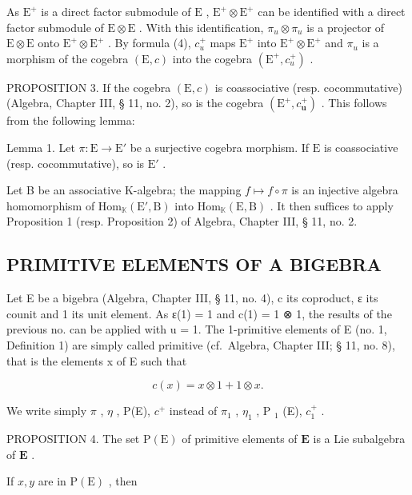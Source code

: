 As \(\mathrm{E}^{+}\) is a direct factor submodule of \(\mathrm{E}\) , \(\mathrm{E}^{+} \otimes \mathrm{E}^{+}\) can be identified with a direct factor submodule of \(\mathrm{E} \otimes \mathrm{E}\) . With this identification, \(\pi_{u} \otimes \pi_{u}\) is a projector of \(\mathrm{E} \otimes \mathrm{E}\) onto \(\mathrm{E}^{+} \otimes \mathrm{E}^{+}\) . By formula (4), \(c_{u}^{+}\) maps \(\mathrm{E}^{+}\) into \(\mathrm{E}^{+} \otimes \mathrm{E}^{+}\) and \(\pi_{u}\) is a morphism of the cogebra \((\mathrm{E}, c)\) into the cogebra \((\mathrm{E}^{+}, c_{u}^{+})\) .

PROPOSITION 3. If the cogebra \((\mathrm{E}, c)\) is coassociative (resp. cocommutative) (Algebra, Chapter III, § 11, no. 2), so is the cogebra \((\mathrm{E}^{+}, c_{\mathbf{u}}^{+})\) . This follows from the following lemma:

Lemma 1. Let \(\pi: \mathrm{E} \to \mathrm{E}'\) be a surjective cogebra morphism. If \(\mathrm{E}\) is coassociative (resp. cocommutative), so is \(\mathrm{E}'\) .

Let B be an associative K-algebra; the mapping \(f \mapsto f \circ \pi\) is an injective algebra homomorphism of \(\mathrm{Hom}_{\mathbb{K}}(\mathrm{E}', \mathrm{B})\) into \(\mathrm{Hom}_{\mathbb{K}}(\mathrm{E}, \mathrm{B})\) . It then suffices to apply Proposition 1 (resp. Proposition 2) of Algebra, Chapter III, § 11, no. 2.

\subsection{PRIMITIVE ELEMENTS OF A BIGEBRA}

Let E be a bigebra (Algebra, Chapter III, § 11, no. 4), c its coproduct, ε its counit and 1 its unit element. As ε(1) = 1 and c(1) = 1 ⊗ 1, the results of the previous no. can be applied with u = 1. The 1-primitive elements of E (no. 1, Definition 1) are simply called primitive (cf.~Algebra, Chapter III; § 11, no. 8), that is the elements x of E such that

\[
c (x) = x \otimes 1 + 1 \otimes x.\tag{5}
\]

We write simply \(\pi\) , \(\eta\) , P(E), \(c^{+}\) instead of \(\pi_{1}\) , \(\eta_{1}\) , P \(_{1}\) (E), \(c_{1}^{+}\) .

PROPOSITION 4. The set \(\mathrm{P(E)}\) of primitive elements of \(\mathbf{E}\) is a Lie subalgebra of \(\mathbf{E}\) .

If \(x, y\) are in \(\mathrm{P(E)}\) , then

